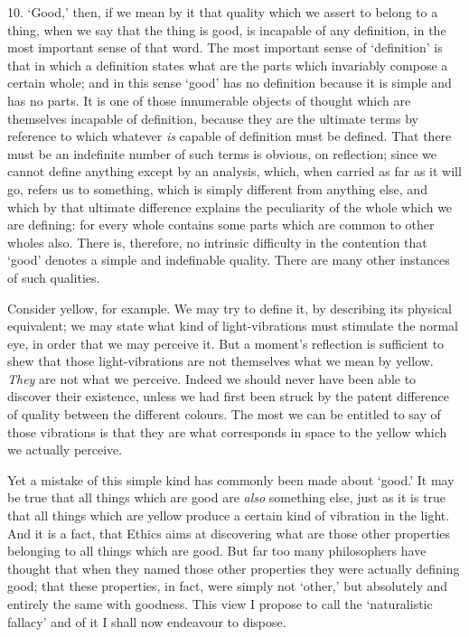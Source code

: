 10. `Good,' then, if we mean by it that quality which we assert to
belong to a thing, when we say that the thing is good, is incapable of
any definition, in the most important sense of that word. The most
important sense of `definition' is that in which a definition states
what are the parts which invariably compose a certain whole; and in
this sense `good' has no definition because it is simple and has no
parts. It is one of  those innumerable objects of thought
which are themselves incapable of definition, because they are the
ultimate terms by reference to which whatever \textit{is} capable of
definition must be defined. That there must be an indefinite number of
such terms is obvious, on reflection; since we cannot define anything
except by an analysis, which, when carried as far as it will go,
refers us to something, which is simply different from anything else,
and which by that ultimate difference explains the peculiarity of the
whole which we are defining: for every whole contains some parts which
are common to other wholes also. There is, therefore, no intrinsic
difficulty in the contention that `good' denotes a simple and
indefinable quality. There are many other instances of such qualities.

Consider yellow, for example. We may try to define it, by describing
its physical equivalent; we may state what kind of light-vibrations
must stimulate the normal eye, in order that we may perceive it. But a
moment's reflection is sufficient to shew that those light-vibrations
are not themselves what we mean by yellow. \textit{They} are not what
we perceive. Indeed we should never have been able to discover their
existence, unless we had first been struck by the patent difference of
quality between the different colours. The most we can be entitled to
say of those vibrations is that they are what corresponds in space to
the yellow which we actually perceive.

Yet a mistake of this simple kind has commonly been made about `good.'
It may be true that all things which are good are \textit{also}
something else, just as it is true that all things which are yellow
produce a certain kind of vibration in the light. And it is a fact,
that Ethics aims at discovering what are those other properties
belonging to all things which are good. But far too many philosophers
have thought that when they named those other properties they were
actually defining good; that these properties, in fact, were simply
not `other,' but absolutely and entirely the same with goodness. This
view I propose to call the `naturalistic fallacy' and of it I shall
now endeavour to dispose.


